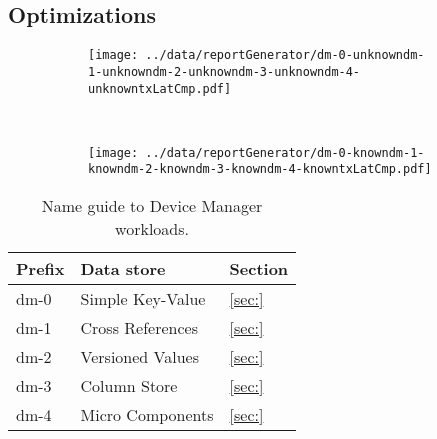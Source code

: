 \documentclass[12pt,openright,twoside]{report}
\begin{document}
\subsection{Optimizations}
\begin{figure}
  \centering
  \begin{subfigure}[b]{0.5\textwidth}
                \centering
                \texttt{[image: ../data/reportGenerator/dm-0-unknowndm-1-unknowndm-2-unknowndm-3-unknowndm-4-unknowntxLatCmp.pdf]}
                \caption{}
                \label{}
        \end{subfigure}%
        ~
        \begin{subfigure}[b]{0.5\textwidth}
                \centering
                \texttt{[image: ../data/reportGenerator/dm-0-knowndm-1-knowndm-2-knowndm-3-knowndm-4-knowntxLatCmp.pdf]}
                \caption{}
                \label{}
        \end{subfigure}
        \caption[Device Manager performance analysis]{}
        \label{fig:dm:performance}
\end{figure}


\begin{table}
\small
\begin{tabular}{lll} 
    Prefix &  Data store & Section\\\toprule
    dm-0 & Simple Key-Value  & \ref{sec:}  \\
    dm-1 & Cross References  & \ref{sec:} \\
    dm-2 & Versioned Values & \ref{sec:} \\
    dm-3 & Column Store & \ref{sec:} \\
    dm-4 & Micro Components & \ref{sec:} \\ \bottomrule
  \end{tabular}
  \caption[Name guide to Device Manager workloads]{Name guide to
    Device Manager workloads.}
  \label{table:names:dm}
\end{table}
\end{document}
